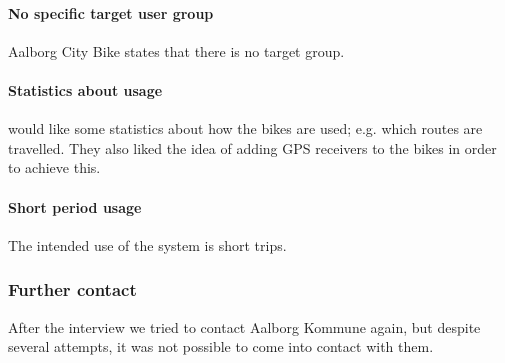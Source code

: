 \paragraph{No specific target user group}
Aalborg City Bike states that there is no target group.

\paragraph{Statistics about usage}
\citybike would like some statistics about how the bikes are used; e.g. which routes are travelled.
They also liked the idea of adding GPS receivers to the bikes in order to achieve this.

\paragraph{Short period usage}
The intended use of the system is short trips.

\subsubsection{Further contact}
After the interview we tried to contact Aalborg Kommune again, but despite several attempts, it was not possible to come into contact with them.
